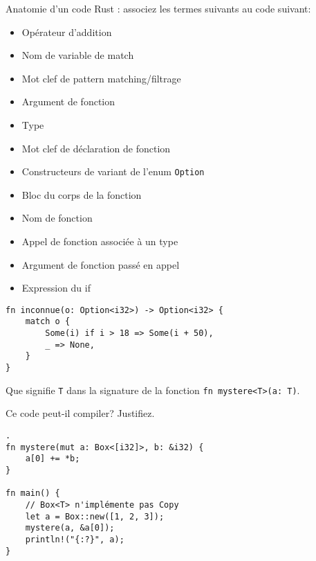 \documentclass[11pt,a4paper,addpoint]{exam}
\begin{document}
\begin{questions}
\question[1] Anatomie d'un code Rust : associez les termes suivants au code suivant:
\begin{multicols}{2}
\begin{itemize}
    \item Opérateur d'addition
    \item Nom de variable de match
    \item Mot clef de pattern matching/filtrage
    \item Argument de fonction
    \item Type
    \item Mot clef de déclaration de fonction
    \item Constructeurs de variant de l'enum \texttt{Option}
    \item Bloc du corps de la fonction
    \item Nom de fonction
    \item Appel de fonction associée à un type
    \item Argument de fonction passé en appel
    \item Expression du if
\end{itemize}
\end{multicols}
\begin{verbatim}
fn inconnue(o: Option<i32>) -> Option<i32> {
    match o {
        Some(i) if i > 18 => Some(i + 50),
        _ => None,
    }
}
\end{verbatim}
\vspace{2in}

\question[1] Que signifie \texttt{T} dans la signature de la fonction \texttt{fn mystere<T>(a: T)}.
\vspace{2in}

\question[1] Ce code peut-il compiler? Justifiez.
\begin{verbatim}
.
fn mystere(mut a: Box<[i32]>, b: &i32) {
    a[0] += *b;
}

fn main() {
    // Box<T> n'implémente pas Copy
    let a = Box::new([1, 2, 3]);
    mystere(a, &a[0]);
    println!("{:?}", a);
}
\end{verbatim}
\vspace{1in}


\end{questions}
\end{document}
